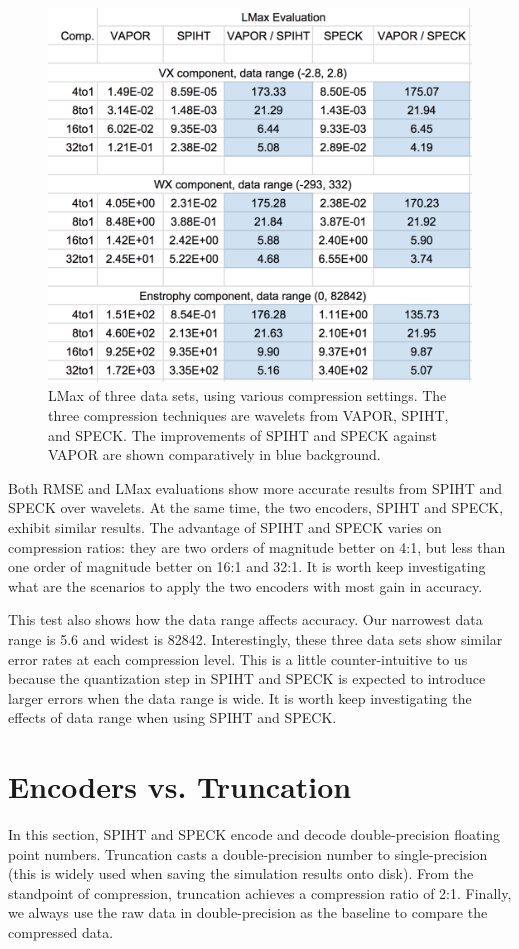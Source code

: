 \documentclass[review]{vgtc}                 %
\begin{document}
\begin{figure}
  \centering
    \includegraphics[width=1\columnwidth]{figs/lmax_fig2.png}
  \caption{
LMax of three data sets, using various compression settings.
%
The three compression techniques are wavelets from VAPOR, 
SPIHT, and SPECK.
%
The improvements of SPIHT and SPECK against VAPOR 
are shown comparatively in blue background.
}
  \label{fig:lmax_fig2}
\end{figure}

Both RMSE and LMax evaluations show more accurate results from
SPIHT and SPECK over wavelets. 
%
At the same time, the two encoders, 
SPIHT and SPECK, exhibit similar results.
%
The advantage of SPIHT and SPECK varies on compression ratios:
they are two orders of magnitude better on 4:1, 
but less than one order of magnitude better on 16:1 and 32:1.
%
It is worth keep investigating what are the scenarios to apply 
the two encoders with most gain in accuracy.

This test also shows how the data range affects accuracy.
%
Our narrowest data range is 5.6 and widest is 82842.
%
Interestingly, these three data sets show similar error rates 
at each compression level.
%
This is a little counter-intuitive to us because the quantization step in
SPIHT and SPECK is expected to introduce larger errors when the data range 
is wide.
%
It is worth keep investigating the effects of data range when using
SPIHT and SPECK.


\section{Encoders vs. Truncation}
%
In this section, SPIHT and SPECK encode and decode 
double-precision floating point numbers.
%
Truncation casts a double-precision number to single-precision
(this is widely used when saving the simulation results onto disk).
%
From the standpoint of compression, truncation achieves a compression ratio
of 2:1.
%
Finally, we always use the raw data in double-precision as the baseline to 
compare the compressed data.
\end{document}
